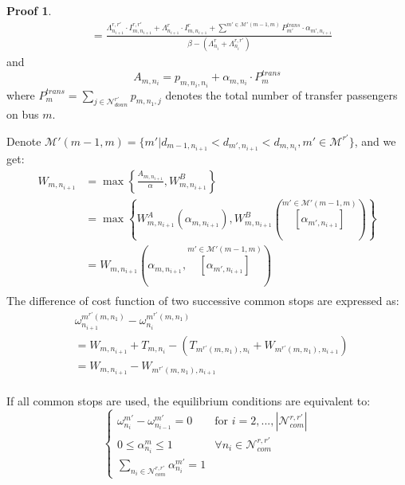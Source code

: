 \documentclass[fleqn]{article}
\newcounter{proof}
\theoremstyle{definition} \newtheorem*{myproof}{Proof}
\begin{document}
\begin{myproof}
\begin{equation}
\begin{split}
            &= \frac{\Lambda_{n_{i+1}}^{r,r'}\cdot I_{m,n_{i+1}}^{r,r'} + \Lambda_{n_{i+1}}^{r}\cdot I_{m,n_{i+1}}^{r} + 
            \sum\limits^{m'\in\mathcal{M'}(m-1,m)} P_{m'}^{trans}\cdot\alpha_{m',n_{i+1}}}
            {\beta-\left(\Lambda_{n_{i}}^{r}+\Lambda_{n_{i}}^{r,r'}\right)}
        \end{split}
    \end{equation}
    and
    \begin{equation}
        A_{m,n_{i}} = p_{m,n_{i},n_{i}} + \alpha_{m,n_{i}}\cdot P_{m}^{trans}
    \end{equation}
    where $P_{m}^{trans}=\sum\limits_{j\in\mathcal{N}_{down}^{r'}} p_{m,n_{1},j}$ denotes the total number of transfer passengers on bus $m$.

    Denote $\mathcal{M'}(m-1,m) = \{m'|d_{m-1,n_{i+1}}<d_{m',n_{i+1}}<d_{m,n_{i}},m'\in\mathcal{M}^{r'}\}$, and we get:
    \begin{equation}
        \begin{split}
            W_{m,n_{i+1}} &= \max \left\{\frac{A_{m,n_{i+1}}}{\alpha},W_{m,n_{i+1}}^{B} \right\}\\
            &= \max \left\{W^{A}_{m,n_{i+1}}\left(\alpha_{m,n_{i+1}}\right),
            W_{m,n_{i+1}}^{B}(\overset{m'\in\mathcal{M'}(m-1,m)}{\left[\alpha_{m',n_{i+1}}\right]}) \right\}\\
            &=W_{m,n_{i+1}}\left(\alpha_{m,n_{i+1}},\overset{m'\in\mathcal{M'}(m-1,m)}{\left[\alpha_{m',n_{i+1}}\right]}\right)\\
        \end{split}
    \end{equation}
    The difference of cost function of two successive common stops are expressed as:
    \begin{equation}
        \begin{split}
            &\omega_{n_{i+1}}^{m^{r'}\left(m,n_{1}\right)} - \omega_{n_{i}}^{m^{r'}\left(m,n_{1}\right)}\\
            &=W_{m,n_{i+1}} + T_{m,n_{i}} - \left(T_{m^{r'}(m,n_{1}),n_{i}} + W_{m^{r'}\left(m,n_{1}\right),n_{i+1}}\right) \\
            &=W_{m,n_{i+1}}-W_{m^{r'}\left(m,n_{1}\right),n_{i+1}}\\
        \end{split}
    \end{equation}

    If all common stops are used, the equilibrium conditions are equivalent to:
    \begin{equation}
        \begin{cases}
            \omega_{n_{i}}^{m'} - \omega_{n_{i-1}}^{m'} = 0 & \text{for } i=2,...,\left|\mathcal{N}_{com}^{r,r'}\right|\\
            0 \leq \alpha_{n_{i}}^{m} \leq 1 &\forall n_{i}\in \mathcal{N}_{com}^{r,r'}\\
            \sum\limits_{n_{i}\in \mathcal{N}_{com}^{r,r'}} \alpha_{n_{i}}^{m'} = 1
        \end{cases}
    \end{equation} 



\end{myproof}
\end{document}
